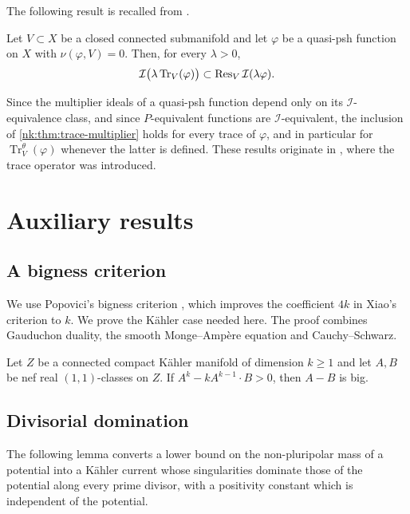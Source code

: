 The following result is recalled from \cite[Proposition~8.2.3]{SGPT}.

\begin{theorem}\label{nk:thm:trace-multiplier}
Let $V\subset X$ be a closed connected submanifold and let $\varphi$ be a
quasi-psh function on $X$ with $\nu(\varphi,V)=0$. Then, for every
$\lambda>0$,
\[
  \mathcal I\bigl(\lambda\operatorname{Tr}_V(\varphi)\bigr)\subset\operatorname{Res}_{V}\mathcal I(\lambda\varphi).
\]
\end{theorem}

Since the multiplier ideals of a quasi-psh function depend only on its
$\mathcal I$-equivalence class, and since $P$-equivalent functions are
$\mathcal I$-equivalent, the inclusion of \cref{nk:thm:trace-multiplier} holds for
every trace of $\varphi$, and in particular for
$\operatorname{Tr}^\theta_V(\varphi)$ whenever the latter is defined. These results
originate in \cite{DX24}, where the trace operator was introduced.

\section{Auxiliary results}\label{nk:sec:aux}

\subsection{A bigness criterion}

We use Popovici's bigness criterion \cite[Theorem~1.1]{Pop16},
which improves the coefficient $4k$ in Xiao's criterion \cite{Xiao15}
to $k$. We prove the K\"ahler case needed here. The proof combines
Gauduchon duality, the smooth Monge--Amp\`ere equation and
Cauchy--Schwarz.

\begin{theorem}\label{nk:thm:nef-difference}
Let $Z$ be a connected compact K\"ahler manifold of dimension $k\geq1$ and let
$A,B$ be nef real $(1,1)$-classes on $Z$. If
$A^k-kA^{k-1}\cdot B>0$, then $A-B$ is big.
\end{theorem}


\subsection{Divisorial domination}

The following lemma converts a lower bound on the non-pluripolar mass of a
potential into a K\"ahler current whose singularities dominate those of the
potential along every prime divisor, with a positivity constant which is
independent of the potential.


